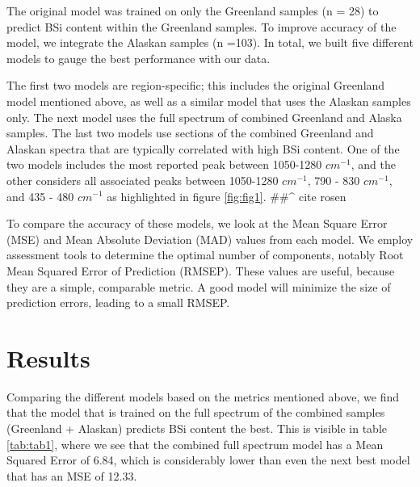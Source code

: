 \documentclass[water,article,submit,moreauthors,pdftex]{mdpi}
\begin{document}
The original model was trained on only the Greenland samples (n = 28) to
predict BSi content within the Greenland samples. To improve accuracy of
the model, we integrate the Alaskan samples (n =103). In total, we built
five different models to gauge the best performance with our data.

The first two models are region-specific; this includes the original
Greenland model mentioned above, as well as a similar model that uses
the Alaskan samples only. The next model uses the full spectrum of
combined Greenland and Alaska samples. The last two models use sections
of the combined Greenland and Alaskan spectra that are typically
correlated with high BSi content. One of the two models includes the
most reported peak between 1050-1280 \(cm^{-1}\), and the other
considers all associated peaks between 1050-1280 \(cm^{-1}\), 790 - 830
\(cm^{-1}\), and 435 - 480 \(cm^{-1}\) as highlighted in figure
\ref{fig:fig1}. \#\#\^{} cite rosen

To compare the accuracy of these models, we look at the Mean Square
Error (MSE) and Mean Absolute Deviation (MAD) values from each model. We
employ assessment tools to determine the optimal number of components,
notably Root Mean Squared Error of Prediction (RMSEP). These values are
useful, because they are a simple, comparable metric. A good model will
minimize the size of prediction errors, leading to a small RMSEP.

\hypertarget{results}{%
\section{Results}\label{results}}

Comparing the different models based on the metrics mentioned above, we
find that the model that is trained on the full spectrum of the combined
samples (Greenland + Alaskan) predicts BSi content the best. This is
visible in table \ref{tab:tab1}, where we see that the combined full
spectrum model has a Mean Squared Error of 6.84, which is considerably
lower than even the next best model that has an MSE of 12.33.
\end{document}
